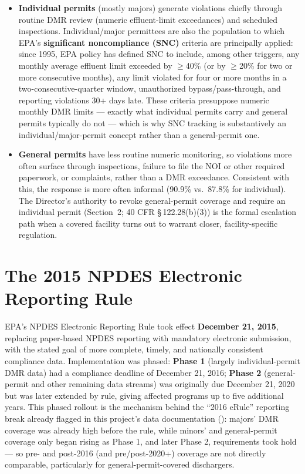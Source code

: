 \documentclass[11pt]{article}
\begin{document}
\begin{itemize}
  \item \textbf{Individual permits} (mostly majors) generate violations chiefly
        through routine DMR review (numeric effluent-limit exceedances) and
        scheduled inspections. Individual/major permittees are also the
        population to which EPA's \textbf{significant noncompliance (SNC)}
        criteria are principally applied: since 1995, EPA policy has defined SNC
        to include, among other triggers, any monthly average effluent limit
        exceeded by $\geq$40\% (or by $\geq$20\% for two or more consecutive
        months), any limit violated for four or more months in a
        two-consecutive-quarter window, unauthorized bypass/pass-through, and
        reporting violations 30+ days late. These criteria presuppose numeric
        monthly DMR limits --- exactly what individual permits carry and general
        permits typically do not --- which is why SNC tracking is substantively
        an individual/major-permit concept rather than a general-permit one.
  \item \textbf{General permits} have less routine numeric monitoring, so
        violations more often surface through inspections, failure to file the
        NOI or other required paperwork, or complaints, rather than a DMR
        exceedance. Consistent with this, the response is more often informal
        (90.9\% vs.\ 87.8\% for individual). The Director's authority to revoke
        general-permit coverage and require an individual permit (Section~2; 40
        CFR \S\,122.28(b)(3)) is the formal escalation path when a covered
        facility turns out to warrant closer, facility-specific regulation.
\end{itemize}

\section{The 2015 NPDES Electronic Reporting Rule}

EPA's NPDES Electronic Reporting Rule took effect \textbf{December 21, 2015},
replacing paper-based NPDES reporting with mandatory electronic submission, with
the stated goal of more complete, timely, and nationally consistent compliance
data. Implementation was phased: \textbf{Phase 1} (largely individual-permit DMR
data) had a compliance deadline of December 21, 2016; \textbf{Phase 2}
(general-permit and other remaining data streams) was originally due December
21, 2020 but was later extended by rule, giving affected programs up to five
additional years. This phased rollout is the mechanism behind the ``2016 eRule''
reporting break already flagged in this project's data documentation
(): majors' DMR coverage was already high before the
rule, while minors' and general-permit coverage only began rising as Phase 1,
and later Phase 2, requirements took hold --- so pre- and post-2016 (and
pre/post-2020+) coverage are not directly comparable, particularly for
general-permit-covered dischargers.
\end{document}

